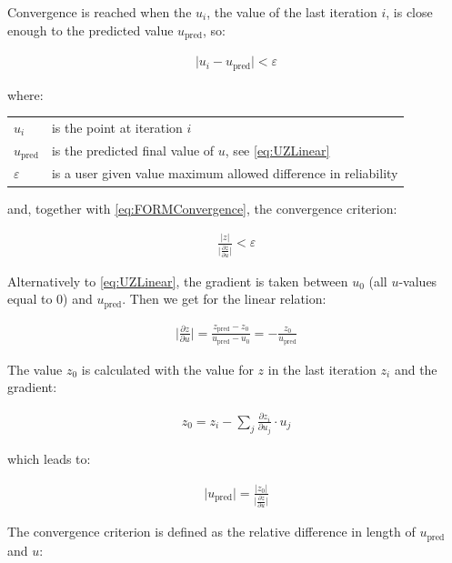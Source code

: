 {Convergence is reached when the $u_i$, the value of the last iteration $i$, is close enough to the predicted value $u_{\text{pred}}$, so:

\begin{align}
\label{eq:FORMConvergence}
\lvert u_i - u_\text{pred} \rvert<\varepsilon
\end{align}

where:
\begin{longtable}{p{16mm}p{\textwidth-24pt-16mm}}  
	$u_i$ & is the point at iteration $i$ \\
	$u_\text{pred}$ & is the predicted final value of $u$, see \autoref{eq:UZLinear} \\
	$\varepsilon$ & is a user given value maximum allowed difference in reliability \\  
\end{longtable}

and, together with \autoref{eq:FORMConvergence}, the convergence criterion:

\begin{align}
\label{eq:FORMConv1}
\frac{\lvert z \rvert}{\lvert \frac{\partial z}{\partial u} \rvert } < \varepsilon
\end{align}

Alternatively to \autoref{eq:UZLinear}, the gradient is taken between $u_0$ (all $u$-values equal to $0$) and $u_\text{pred}$. Then we get for the linear relation:

\begin{align}
\label{eq:UZLinear2}
\lvert \frac{\partial z}{\partial u} \rvert = \frac{z_\text{pred} - z_0}{u_\text{pred} - u_0} = - \frac{z_0}{u_\text{pred}}
\end{align}

The value $z_0$ is calculated with the value for $z$ in the last iteration $z_i$ and the gradient:

\begin{align}
\label{eq:UZLinear3}
z_0 = z_i - \sum_j \frac{\partial z_i}{\partial u_j} \cdot u_j
\end{align}

which leads to:

\begin{align}
\label{eq:BetaPredicted2}
\lvert u_\text{pred}\rvert = \frac{\lvert z_0 \rvert}{\lvert \frac{\partial z}{\partial u} \rvert }
\end{align}

The convergence criterion is defined as the relative difference in length of $u_\text{pred}$ and $u$:

}
